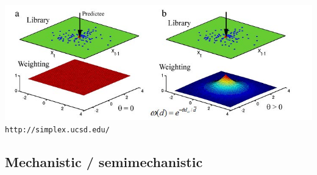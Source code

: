 \documentclass[11pt,compress,aspectratio=1610]{beamer}
\begin{document}
\begin{frame}
\begin{center}
    \includegraphics[width=\textwidth,height=0.95\textheight,keepaspectratio=true]{../images/smap.jpg}
    \\
    {\scriptsize \texttt{http://simplex.ucsd.edu/} }
\end{center}
\end{frame}



\subsection{Mechanistic / semimechanistic}
\end{document}
